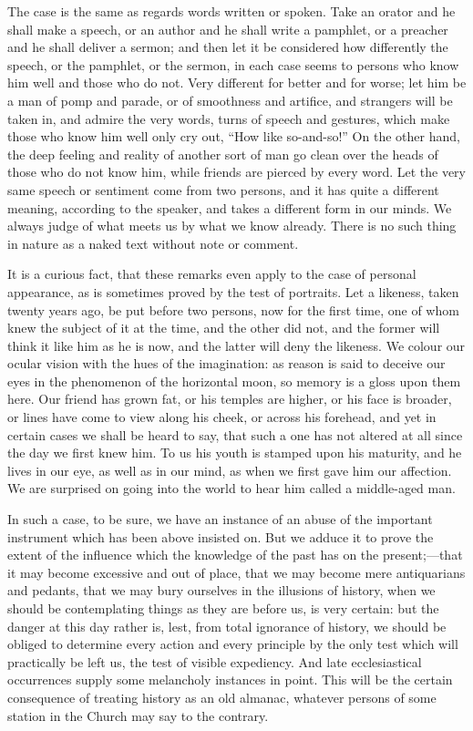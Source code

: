 The case is the same as regards words written or
spoken. Take an orator and he shall make a speech, or an author and he
shall write a pamphlet, or a preacher and he shall deliver a sermon;
and then let it be considered how differently the speech, or the
pamphlet, or the sermon, in each case seems to persons who know him
well and those who do not. Very different for better and for worse;
let him be a man of pomp and parade, or of smoothness and artifice,
and strangers will be taken in, and admire the very words, turns of
speech and gestures, which make those who know him well only cry out, ``How
like so-and-so!'' On the other hand, the deep feeling and reality
of another sort of man go clean over the heads of those who do not
know him, while friends are pierced by every word. Let the very same
speech or sentiment come from two persons, and it has quite a
different meaning, according to the speaker, and takes a different
form in our minds. We always judge of what meets us by what we know
already. There is no such thing in nature as a naked text without note
or comment.

It is a curious fact, that these remarks even
apply to the case of personal appearance, as is sometimes proved by
the test of portraits. Let a likeness, taken twenty years ago, be put
before two persons, now for the first time, one of whom knew the
subject of it at the time, and the other did not, and the former will
think it like him as he is now, and the latter will deny the likeness.
We colour our ocular vision with the hues of the imagination: as
reason is said to deceive our eyes in the phenomenon of the horizontal
moon, so memory is a gloss upon them here. Our friend has grown fat,
or his temples are higher, or his face is broader, or lines have come
to view along his cheek, or across his forehead, and yet in certain
cases we shall be heard to say, that such a one has not altered at all
since the day we first knew him. To us his youth is stamped upon his
maturity, and he lives in our eye, as well as in our mind, as when we
first gave him our affection. We are surprised on going into the world
to hear him called a middle-aged man.

In such a case, to be sure, we have an instance
of an abuse of the important instrument which has been above insisted
on. But we adduce it to prove the extent of the influence which the
knowledge of the past has on the present;—that it may become
excessive and out of place, that we may become mere antiquarians and
pedants, that we may bury ourselves in the illusions of history,
when we should be contemplating things as they are before us, is very
certain: but the danger at this day rather is, lest, from total
ignorance of history, we should be obliged to determine every action
and every principle by the only test which will practically be left
us, the test of visible expediency. And late ecclesiastical
occurrences supply some melancholy instances in point. This will be
the certain consequence of treating history as an old almanac,
whatever persons of some station in the Church may say to the
contrary.

